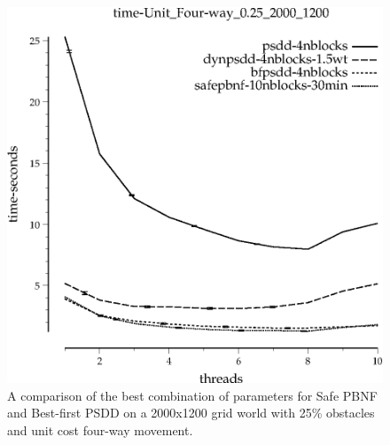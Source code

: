 \documentclass{article}
\begin{document}
\begin{figure}[t]
\begin{center}
\includegraphics{grid_unit_four-way_0.25_2000_1200/time-Unit_Four-way_0.25_2000_1200.eps}
\caption{A comparison of the best combination of parameters for Safe
  PBNF and Best-first PSDD on a 2000x1200 grid world with 25\%
  obstacles and unit cost four-way movement.}
\end{center}
\end{figure}

\end{document}
